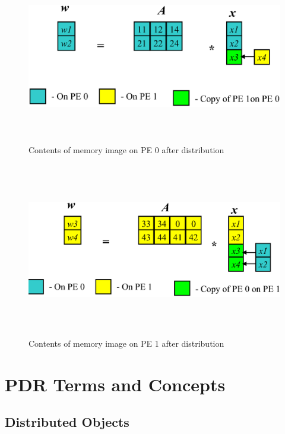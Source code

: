 \documentclass[12pt,relax]{PetraObjectModel}
\begin{document}
\begin{figure} 
\begin{center} 
\includegraphics[height=3in]{PE0SpMV}
\end{center} 
\label{PE0MatrixVectorDistribution}
\caption{Contents of memory image on PE 0 after distribution}
\end{figure} 

\begin{figure} 
\begin{center} 
\includegraphics[height=3in]{PE1SpMV}
\end{center} 
\label{PE1MatrixVectorDistribution}
\caption{Contents of memory image on PE 1 after distribution}
\end{figure} 


\section{PDR Terms and Concepts}
\label{sect:concepts}

\subsection{Distributed Objects}
\end{document}
